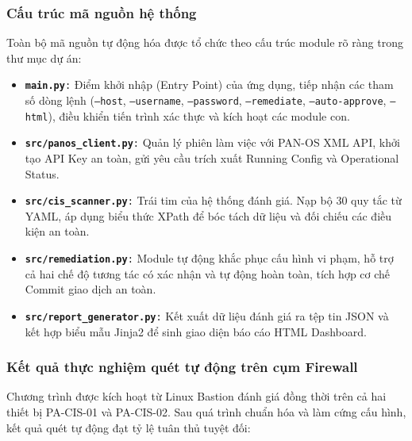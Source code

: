 \documentclass[12pt,a4paper]{article}
\begin{document}
\subsubsection{Cấu trúc mã nguồn hệ thống}
Toàn bộ mã nguồn tự động hóa được tổ chức theo cấu trúc module rõ ràng trong thư mục dự án:
\begin{itemize}
    \item \texttt{\textbf{main.py}:} Điểm khởi nhập (Entry Point) của ứng dụng, tiếp nhận các tham số dòng lệnh (\texttt{--host}, \texttt{--username}, \texttt{--password}, \texttt{--remediate}, \texttt{--auto-approve}, \texttt{--html}), điều khiển tiến trình xác thực và kích hoạt các module con.
    \item \texttt{\textbf{src/panos\_client.py}:} Quản lý phiên làm việc với PAN-OS XML API, khởi tạo API Key an toàn, gửi yêu cầu trích xuất Running Config và Operational Status.
    \item \texttt{\textbf{src/cis\_scanner.py}:} Trái tim của hệ thống đánh giá. Nạp bộ 30 quy tắc từ YAML, áp dụng biểu thức XPath để bóc tách dữ liệu và đối chiếu các điều kiện an toàn.
    \item \texttt{\textbf{src/remediation.py}:} Module tự động khắc phục cấu hình vi phạm, hỗ trợ cả hai chế độ tương tác có xác nhận và tự động hoàn toàn, tích hợp cơ chế Commit giao dịch an toàn.
    \item \texttt{\textbf{src/report\_generator.py}:} Kết xuất dữ liệu đánh giá ra tệp tin JSON và kết hợp biểu mẫu Jinja2 để sinh giao diện báo cáo HTML Dashboard.
\end{itemize}

\subsubsection{Kết quả thực nghiệm quét tự động trên cụm Firewall}
Chương trình được kích hoạt từ Linux Bastion đánh giá đồng thời trên cả hai thiết bị PA-CIS-01 và PA-CIS-02. Sau quá trình chuẩn hóa và làm cứng cấu hình, kết quả quét tự động đạt tỷ lệ tuân thủ tuyệt đối:
\end{document}

